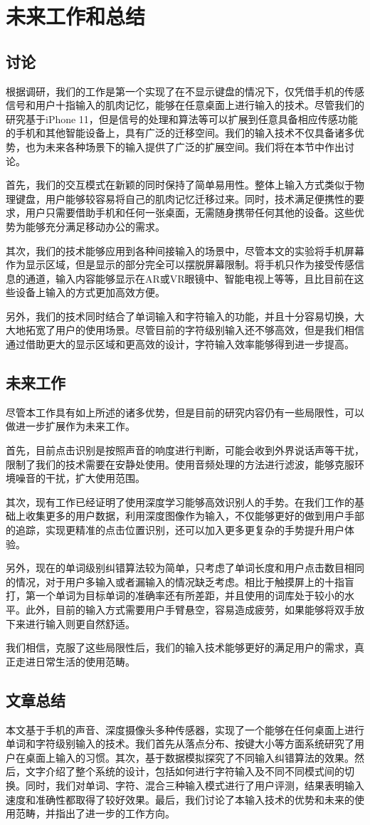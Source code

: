 \chapter{未来工作和总结}
\label{cha:conclusion}
\section{讨论}
根据调研，我们的工作是第一个实现了在不显示键盘的情况下，仅凭借手机的传感信号和用户十指输入的肌肉记忆，能够在任意桌面上进行输入的技术。尽管我们的研究基于iPhone 11，但是信号的处理和算法等可以扩展到任意具备相应传感功能的手机和其他智能设备上，具有广泛的迁移空间。我们的输入技术不仅具备诸多优势，也为未来各种场景下的输入提供了广泛的扩展空间。我们将在本节中作出讨论。

首先，我们的交互模式在新颖的同时保持了简单易用性。整体上输入方式类似于物理键盘，用户能够较容易将自己的肌肉记忆迁移过来。同时，技术满足便携性的要求，用户只需要借助手机和任何一张桌面，无需随身携带任何其他的设备。这些优势为能够充分满足移动办公的需求。

其次，我们的技术能够应用到各种间接输入的场景中，尽管本文的实验将手机屏幕作为显示区域，但是显示的部分完全可以摆脱屏幕限制。将手机只作为接受传感信息的通道，输入内容能够显示在AR或VR眼镜中、智能电视上等等，且比目前在这些设备上输入的方式更加高效方便。

另外，我们的技术同时结合了单词输入和字符输入的功能，并且十分容易切换，大大地拓宽了用户的使用场景。尽管目前的字符级别输入还不够高效，但是我们相信通过借助更大的显示区域和更高效的设计，字符输入效率能够得到进一步提高。

\section{未来工作}
尽管本工作具有如上所述的诸多优势，但是目前的研究内容仍有一些局限性，可以做进一步扩展作为未来工作。

首先，目前点击识别是按照声音的响度进行判断，可能会收到外界说话声等干扰，限制了我们的技术需要在安静处使用。使用音频处理的方法进行滤波，能够克服环境噪音的干扰，扩大使用范围。

其次，现有工作已经证明了使用深度学习能够高效识别人的手势\cite{MolchanovGKK15}。在我们工作的基础上收集更多的用户数据，利用深度图像作为输入，不仅能够更好的做到用户手部的追踪，实现更精准的点击位置识别，还可以加入更多更复杂的手势提升用户体验。

另外，现在的单词级别纠错算法较为简单，只考虑了单词长度和用户点击数目相同的情况，对于用户多输入或者漏输入的情况缺乏考虑。相比于触摸屏上的十指盲打，第一个单词为目标单词的准确率还有所差距，并且使用的词库处于较小的水平。此外，目前的输入方式需要用户手臂悬空，容易造成疲劳，如果能够将双手放下来进行输入则更自然舒适。

我们相信，克服了这些局限性后，我们的输入技术能够更好的满足用户的需求，真正走进日常生活的使用范畴。

\section{文章总结}
本文基于手机的声音、深度摄像头多种传感器，实现了一个能够在任何桌面上进行单词和字符级别输入的技术。我们首先从落点分布、按键大小等方面系统研究了用户在桌面上输入的习惯。其次，基于数据模拟探究了不同输入纠错算法的效果。然后，文字介绍了整个系统的设计，包括如何进行字符输入及不同不同模式间的切换。同时，我们对单词、字符、混合三种输入模式进行了用户评测，结果表明输入速度和准确性都取得了较好效果。最后，我们讨论了本输入技术的优势和未来的使用范畴，并指出了进一步的工作方向。